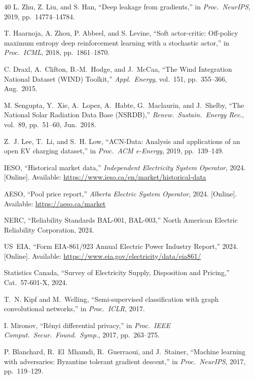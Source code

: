 \documentclass[journal]{IEEEtran}
\begin{document}
\begin{thebibliography}{40}
L. Zhu, Z. Liu, and S. Han,
``Deep leakage from gradients,''
in \textit{Proc.\ NeurIPS}, 2019, pp.~14774--14784.

T. Haarnoja, A. Zhou, P. Abbeel, and S. Levine,
``Soft actor-critic: Off-policy maximum entropy deep reinforcement
learning with a stochastic actor,''
in \textit{Proc.\ ICML}, 2018, pp.~1861--1870.

C. Draxl, A.~Clifton, B.-M.~Hodge, and J.~McCaa,
``The Wind Integration National Dataset (WIND) Toolkit,''
\textit{Appl.\ Energy}, vol.~151, pp.~355--366, Aug.\ 2015.

M. Sengupta, Y.~Xie, A.~Lopez, A.~Habte, G.~Maclaurin, and J.~Shelby,
``The National Solar Radiation Data Base (NSRDB),''
\textit{Renew.\ Sustain.\ Energy Rev.}, vol.~89, pp.~51--60,
Jun.\ 2018.

Z.~J. Lee, T.~Li, and S.~H. Low,
``ACN-Data: Analysis and applications of an open EV charging dataset,''
in \textit{Proc.\ ACM e-Energy}, 2019, pp.~139--149.

IESO, ``Historical market data,''
\textit{Independent Electricity System Operator}, 2024. [Online].
Available: \url{https://www.ieso.ca/en/market/historical-data}

AESO, ``Pool price report,''
\textit{Alberta Electric System Operator}, 2024. [Online].
Available: \url{https://aeso.ca/market}

NERC,
``Reliability Standards BAL-001, BAL-003,''
North American Electric Reliability Corporation, 2024.

US~EIA,
``Form EIA-861/923 Annual Electric Power Industry Report,'' 2024.
[Online]. Available: \url{https://www.eia.gov/electricity/data/eia861/}

Statistics Canada,
``Survey of Electricity Supply, Disposition and Pricing,''
Cat.~57-601-X, 2024.

T.~N. Kipf and M.~Welling,
``Semi-supervised classification with graph convolutional networks,''
in \textit{Proc.\ ICLR}, 2017.

I. Mironov,
``Rényi differential privacy,''
in \textit{Proc.\ IEEE Comput.\ Secur.\ Found.\ Symp.}, 2017,
pp.~263--275.

P. Blanchard, R.~El~Mhamdi, R.~Guerraoui, and J.~Stainer,
``Machine learning with adversaries: Byzantine tolerant gradient
descent,''
in \textit{Proc.\ NeurIPS}, 2017, pp.~119--129.


\end{thebibliography}
\end{document}
